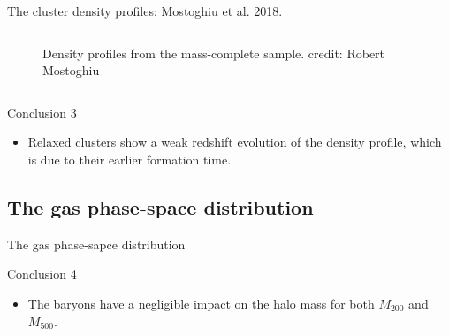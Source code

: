 \documentclass[aspectratio=43]{beamer}
\begin{document}
\begin{frame}{The cluster density profiles: Mostoghiu et al. 2018.}
\begin{columns}[t]
\begin{column}{0.7\textwidth}
{\begin{figure}
        \caption{Density profiles from the mass-complete sample. credit: Robert Mostoghiu}
      \end{figure}}
    \end{column}
  \end{columns}
\end{frame}
\begin{frame}{Conclusion 3}
  {
  \begin{itemize}
    \item Relaxed clusters show a weak redshift evolution of the density profile, which is due to their earlier formation time.
  \end{itemize}}
\end{frame}

\subsection{The gas phase-space distribution}\label{Arthur}
\begin{frame}{The gas phase-sapce distribution}

\end{frame}
\begin{frame}{Conclusion 4}
  {
  \begin{itemize}
    \item The baryons have a negligible impact on the halo mass for both $M_{200}$ and $M_{500}$.
  \end{itemize}}
\end{frame}
\end{document}
